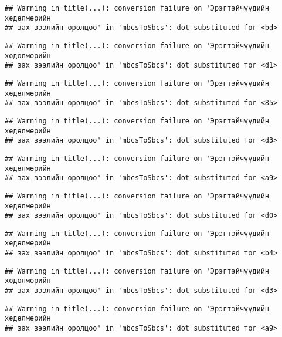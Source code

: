 \documentclass[]{article}
\begin{document}
\begin{verbatim}
## Warning in title(...): conversion failure on 'Эрэгтэйчүүдийн хөдөлмөрийн
## зах зээлийн оролцоо' in 'mbcsToSbcs': dot substituted for <bd>
\end{verbatim}

\begin{verbatim}
## Warning in title(...): conversion failure on 'Эрэгтэйчүүдийн хөдөлмөрийн
## зах зээлийн оролцоо' in 'mbcsToSbcs': dot substituted for <d1>
\end{verbatim}

\begin{verbatim}
## Warning in title(...): conversion failure on 'Эрэгтэйчүүдийн хөдөлмөрийн
## зах зээлийн оролцоо' in 'mbcsToSbcs': dot substituted for <85>
\end{verbatim}

\begin{verbatim}
## Warning in title(...): conversion failure on 'Эрэгтэйчүүдийн хөдөлмөрийн
## зах зээлийн оролцоо' in 'mbcsToSbcs': dot substituted for <d3>
\end{verbatim}

\begin{verbatim}
## Warning in title(...): conversion failure on 'Эрэгтэйчүүдийн хөдөлмөрийн
## зах зээлийн оролцоо' in 'mbcsToSbcs': dot substituted for <a9>
\end{verbatim}

\begin{verbatim}
## Warning in title(...): conversion failure on 'Эрэгтэйчүүдийн хөдөлмөрийн
## зах зээлийн оролцоо' in 'mbcsToSbcs': dot substituted for <d0>
\end{verbatim}

\begin{verbatim}
## Warning in title(...): conversion failure on 'Эрэгтэйчүүдийн хөдөлмөрийн
## зах зээлийн оролцоо' in 'mbcsToSbcs': dot substituted for <b4>
\end{verbatim}

\begin{verbatim}
## Warning in title(...): conversion failure on 'Эрэгтэйчүүдийн хөдөлмөрийн
## зах зээлийн оролцоо' in 'mbcsToSbcs': dot substituted for <d3>
\end{verbatim}

\begin{verbatim}
## Warning in title(...): conversion failure on 'Эрэгтэйчүүдийн хөдөлмөрийн
## зах зээлийн оролцоо' in 'mbcsToSbcs': dot substituted for <a9>
\end{verbatim}
\end{document}

